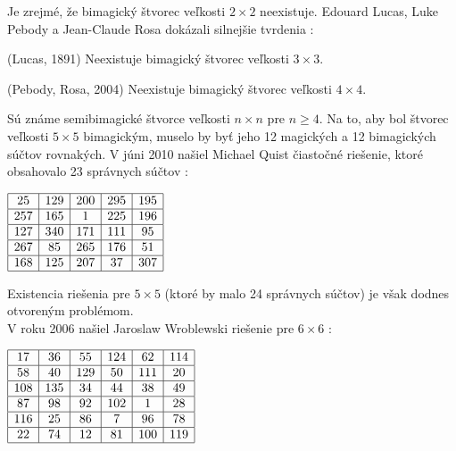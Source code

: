 Je zrejmé, že bimagický štvorec veľkosti $2 \times 2$ neexistuje. Edouard Lucas, Luke Pebody a Jean-Claude Rosa dokázali silnejšie tvrdenia \cite{multimagie}:

\begin{theorem} (Lucas, 1891) Neexistuje bimagický štvorec veľkosti $3 \times 3$.
\end{theorem}

\begin{theorem} (Pebody, Rosa, 2004) Neexistuje bimagický štvorec veľkosti $4 \times 4$.
\end{theorem}

Sú známe semibimagické štvorce veľkosti $n \times n$ pre $n \geq 4$. Na to, aby bol štvorec veľkosti $5 \times 5$ bimagickým, muselo by byť jeho 12 magických a 12 bimagických súčtov rovnakých. V júni 2010 našiel Michael Quist čiastočné riešenie, ktoré obsahovalo 23 správnych súčtov \cite{multimagie}:

\begin{center}
$\begin{array}{ |c|c|c|c|c| }
\hline
25 & 129 & 200 & 295 & 195 \\ 
\hline
257 & 165 & 1 & 225 & 196  \\ 
\hline
127 & 340 & 171 & 111 & 95 \\ 
\hline
267 & 85 & 265 & 176 & 51 \\ 
\hline
168 & 125 & 207 & 37 & 307 \\
\hline
\end{array}$
\end{center}

Existencia riešenia pre $5 \times 5$ (ktoré by malo 24 správnych súčtov) je však dodnes otvoreným problémom. \\

V roku 2006 našiel Jaroslaw Wroblewski riešenie pre $6 \times 6$ \cite{multimagie}:

\begin{center}
$\begin{array}{ |c|c|c|c|c|c| } 
\hline
17 & 36 & 55 & 124 & 62 & 114 \\ 
\hline
58 & 40 & 129 & 50 & 111 & 20 \\ 
\hline
108 & 135 & 34 & 44 & 38 & 49 \\
\hline
87 & 98 & 92 & 102 & 1 & 28 \\
\hline
116 & 25 & 86 & 7 & 96 & 78 \\
\hline
22 & 74 & 12 & 81 & 100 & 119 \\
\hline
\end{array}$
\end{center}

